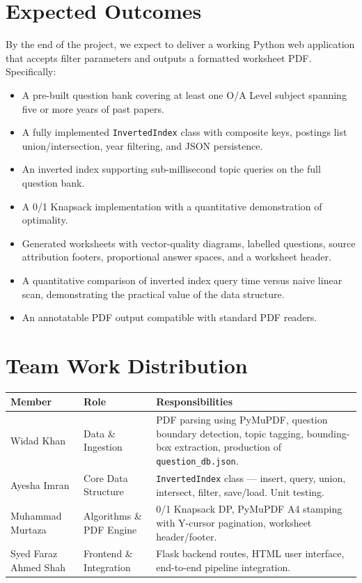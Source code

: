 \documentclass[10pt]{article}
\begin{document}
\section{Expected Outcomes}
By the end of the project, we expect to deliver a working Python web application that accepts filter parameters and outputs a formatted worksheet PDF. Specifically:

\begin{itemize}
    \item A pre-built question bank covering at least one O/A Level subject spanning five or more years of past papers.
    \item A fully implemented \texttt{InvertedIndex} class with composite keys, postings list union/intersection, year filtering, and JSON persistence.
    \item An inverted index supporting sub-millisecond topic queries on the full question bank.
    \item A 0/1 Knapsack implementation with a quantitative demonstration of optimality.
    \item Generated worksheets with vector-quality diagrams, labelled questions, source attribution footers, proportional answer spaces, and a worksheet header.
    \item A quantitative comparison of inverted index query time versus naive linear scan, demonstrating the practical value of the data structure.
    \item An annotatable PDF output compatible with standard PDF readers.
\end{itemize}

\section{Team Work Distribution}

\vspace{4pt}
\begin{tabularx}{\textwidth}{@{} L{3.2cm} L{3cm} X @{}}
  \toprule
  \textbf{Member} & \textbf{Role} & \textbf{Responsibilities} \\
  \midrule
  Widad Khan & Data \& Ingestion &
    PDF parsing using PyMuPDF, question boundary detection, topic tagging, bounding-box extraction, production of \texttt{question\_db.json}. \\[4pt]
  Ayesha Imran & Core Data Structure &
    \texttt{InvertedIndex} class --- insert, query, union, intersect, filter, save/load. Unit testing. \\[4pt]
  Muhammad Murtaza & Algorithms \& PDF Engine &
    0/1 Knapsack DP, PyMuPDF A4 stamping with Y-cursor pagination, worksheet header/footer. \\[4pt]
  Syed Faraz Ahmed Shah & Frontend \& Integration &
    Flask backend routes, HTML user interface, end-to-end pipeline integration. \\
  \bottomrule
\end{tabularx}
\end{document}
